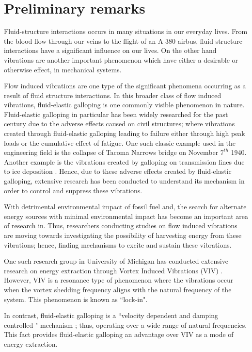 \chapter{Preliminary remarks}

Fluid-structure interactions occurs in many situations in our everyday lives. From the blood flow through our veins to the flight of an A-380 airbus, fluid structure interactions have a significant influence on our lives. On the other hand vibrations are another important phenomenon which have either a desirable or otherwise effect, in mechanical systems.  


Flow induced vibrations are one type of the significant phenomena occurring as a result of fluid structure interactions. In this broader class of flow induced vibrations, fluid-elastic galloping is one commonly visible phenomenon in nature. Fluid-elastic galloping in particular has been widely researched for the past century due to the adverse effects caused on civil structures; where vibrations created through fluid-elastic galloping  leading to failure either through high peak loads or the cumulative effect of fatigue. One such classic example used in the engineering field is the collapse of Tacoma Narrows bridge on November $7^{th}$ 1940. Another example is the vibrations created by galloping on transmission lines due to ice deposition \citep{Parkinson1964}. Hence, due to these adverse effects created by fluid-elastic galloping, extensive research has been conducted to understand its mechanism in order to control and suppress these vibrations.  

With detrimental environmental impact of  fossil fuel and, the search for alternate energy sources with minimal environmental impact has become an important area of research in. Thus, researchers conducting studies on flow induced vibrations are moving towards investigating the possibility of harvesting energy from these vibrations; hence, finding mechanisms to excite and sustain these vibrations\citep{Barrero-Gil2010a}.  

One such research group in University of Michigan has conducted extensive research on energy extraction through Vortex Induced Vibrations (VIV) \citep{Bernitsas2008a-concept, Bernitsas2009, Raghavan2010a, Lee2011b}. However, VIV is a resonance type of phenomenon where the vibrations occur when the vortex shedding frequency aligns with the natural frequency of the system. This phenomenon is known as ``lock-in".

In contrast, fluid-elastic galloping is a ``velocity dependent and damping controlled " mechanism \citep{Paidoussis2010}; thus, operating over a wide range of natural frequencies. This fact provides fluid-elastic galloping an advantage over VIV as a mode of energy extraction. 

